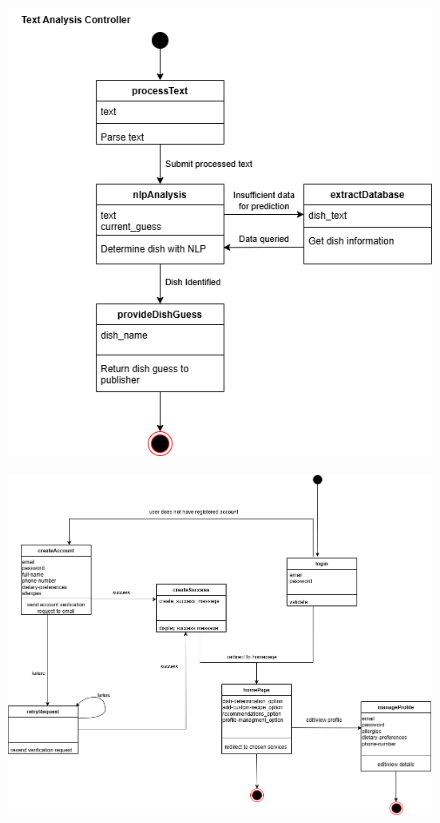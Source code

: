 \documentclass[]{article}
\begin{document}
\begin{figure}[H]
	\centering
   \includegraphics[width=\textwidth]{image/D3_state_diagrams/text_analysis.png}
\end{figure}

\begin{figure}[H]
	\centering
   \includegraphics[width=\textwidth]{image/D3_state_diagrams/account_management.png}
\end{figure}
\end{document}
